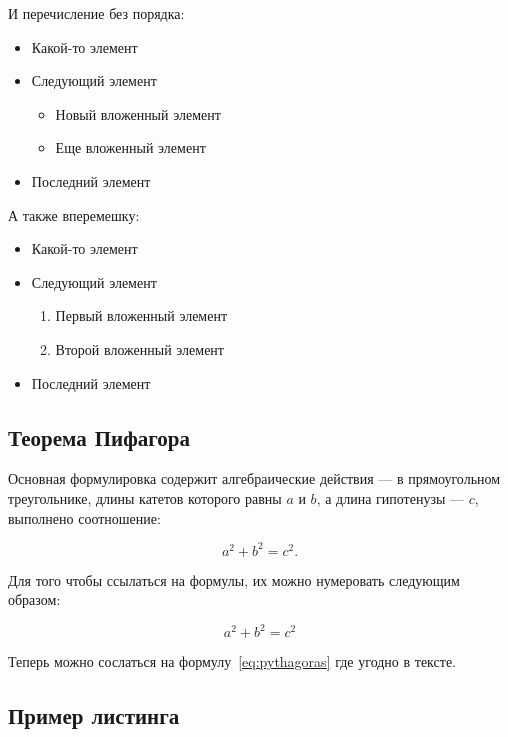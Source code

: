 И перечисление без порядка:

\begin{itemize}
\tightlist
\item
  Какой-то элемент
\item
  Следующий элемент

  \begin{itemize}
  \tightlist
  \item
    Новый вложенный элемент
  \item
    Еще вложенный элемент
  \end{itemize}
\item
  Последний элемент
\end{itemize}

А также вперемешку:

\begin{itemize}
\tightlist
\item
  Какой-то элемент
\item
  Следующий элемент

  \begin{enumerate}
  \def\labelenumi{\arabic{enumi}.}
  \tightlist
  \item
    Первый вложенный элемент
  \item
    Второй вложенный элемент
  \end{enumerate}
\item
  Последний элемент
\end{itemize}

\subsection{Теорема Пифагора}\label{sec:pythagoras}

Основная формулировка содержит алгебраические действия --- в
прямоугольном треугольнике, длины катетов которого равны \(a\) и \(b\),
а длина гипотенузы --- \(c\), выполнено соотношение:

\[
a^2 + b^2 = c^2.
\]

Для того чтобы ссылаться на формулы, их можно нумеровать следующим
образом:

\begin{equation}\label{eq:pythagoras}{
a^2 + b^2 = c^2
}\end{equation}

Теперь можно сослаться на формулу~\eqref{eq:pythagoras} где угодно в
тексте.

\subsection{Пример листинга}\label{sec:lst-example}

